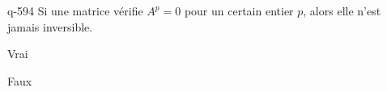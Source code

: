 \begin{truefalse}{q-594}
Si une matrice vérifie $A^p=0$ pour un certain entier $p$, alors elle n'est jamais inversible.
\item* Vrai
\item Faux
\end{truefalse}

